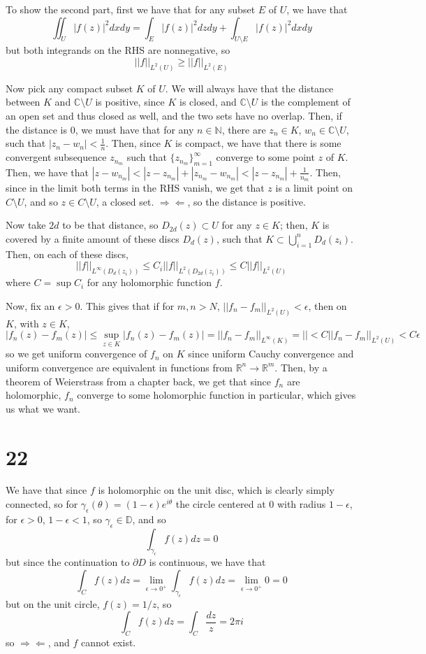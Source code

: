 \documentclass[12pt,letterpaper]{article}
\theoremstyle{definition}
\newcommand{\contra}{\Rightarrow\!\Leftarrow}
\newcommand{\R}{\mathbb{R}}
\newcommand{\N}{\mathbb{N}}
\newcommand{\C}{\mathbb{C}}
\begin{document}
To show the second part, first we have that for any subset $E$ of $U$, we have that
\[
  \iint_{U}|f(z)|^{2}dxdy = \int_{E}|f(z)|^{2}dzdy + \int_{U \setminus E}|f(z)|^{2}dxdy
\]
but both integrands on the RHS are nonnegative, so
\[
  ||f||_{L^{2}(U)} \geq ||f||_{L^{2}(E)}
\]

Now pick any compact subset $K$ of $U$. We will always have that the distance between $K$ and $\C \setminus U$ is positive, since $K$ is closed, and $\C \setminus U$ is the complement of an open set and thus closed as well, and the two sets have no overlap. Then, if the distance is 0, we must have that for any $n \in \N$, there are $z_{n} \in K$, $w_{n} \in \C \setminus U$, such that $|z_{n} - w_{n}| < \frac{1}{n}$. Then, since $K$ is compact, we have that there is some convergent subsequence $z_{n_{m}}$ such that $\{z_{n_{m}}\}_{m=1}^{\infty}$ converge to some point $z$ of $K$. Then, we have that $|z - w_{n_{m}}| < |z - z_{n_{m}}| + |z_{n_{m}} - w_{n_{m}}| < |z-z_{n_{m}}| + \frac{1}{n_{m}}$. Then, since in the limit both terms in the RHS vanish, we get that $z$ is a limit point on $C \setminus U$, and so $z \in C \setminus U$, a closed set. $\contra$, so the distance is positive.

Now take $2d$ to be that distance, so $D_{2d}(z) \subset U$ for any $z \in K$; then, $K$ is covered by a finite amount of these discs $D_{d}(z)$, such that $K \subset \bigcup_{i=1}^{n}D_{d}(z_{i})$. Then, on each of these discs,
\[
  ||f||_{L^{\infty}(D_{d}(z_{i}))} \leq C_{i}||f||_{L^{2}(D_{2d}(z_{i}))} \leq C||f||_{L^{2}(U)}
\]
where $C = \sup{C_{i}}$ for any holomorphic function $f$.

Now, fix an $\epsilon > 0$. This gives that if for $m,n > N$, $||f_{n} - f_{m}||_{L^{2}(U)} < \epsilon$, then on $K$, with $z \in K$,
\[
  |f_{n}(z) - f_{m}(z)| \leq \sup_{z \in K}|f_{n}(z) - f_{m}(z)| = ||f_{n} - f_{m}||_{L^{\infty}(K)} = || < C||f_{n} - f_{m}||_{L^{2}(U)} < C\epsilon
\]
so we get uniform convergence of $f_{n}$ on $K$ since uniform Cauchy convergence and uniform convergence are equivalent in functions from $\R^{n} \rightarrow \R^{m}$. Then, by a theorem of Weierstrass from a chapter back, we get that since $f_{n}$ are holomorphic, $f_{n}$ converge to some holomorphic function in particular, which gives us what we want.

\section*{22}

We have that since $f$ is holomorphic on the unit disc, which is clearly simply connected, so for $\gamma_{\epsilon}(\theta) = (1-\epsilon)e^{i\theta}$ the circle centered at $0$ with radius $1-\epsilon$, for $\epsilon > 0$, $1-\epsilon < 1$, so $\gamma_{\epsilon} \in \mathbb{D}$, and so
\[
  \int_{\gamma_{\epsilon}}f(z)dz = 0
\]
but since the continuation to $\partial{D}$ is continuous, we have that
\[
  \int_{C}f(z)dz = \lim_{\epsilon \rightarrow 0^{+}}\int_{\gamma_{\epsilon}}f(z)dz = \lim_{\epsilon \rightarrow 0^{+}}0 = 0
\]
but on the unit circle, $f(z) = 1/z$, so
\[
  \int_{C}f(z)dz = \int_{C}\frac{dz}{z} = 2\pi i
\]
so $\contra$, and $f$ cannot exist.
\end{document}
